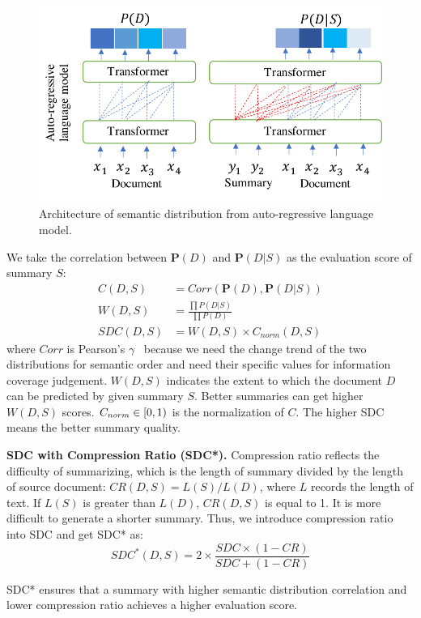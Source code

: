 \begin{figure}[th]
	\centering
	\includegraphics[width=1.0\linewidth]{app.pdf}
	\caption{Architecture of semantic distribution from auto-regressive language model.}
	\label{fig:app}
\end{figure}

We take the correlation between $\mathbf{P}(D)$ and $\mathbf{P}(D|S)$ as the evaluation score of summary $S$:
\begin{align}
	C(D,S)&=Corr(\mathbf{P}(D), \mathbf{P}(D|S)) \\
	W(D,S)&=  \frac{\prod{P(D|S)}}{\prod{P(D)}} \\
	SDC(D,S)&=  W(D,S) \times C_{norm}(D,S)
\end{align}
where $Corr$ is 
Pearson's $\gamma$~\cite{pearson} because we need the change trend of the two distributions for semantic order and need their specific values for information coverage judgement. $W(D,S)$ indicates the extent to which the document $D$ can be predicted by given summary $S$.
Better summaries can get higher $W(D,S)$ scores.
$C_{norm} \in \left[0,1\notag\right)$ is the normalization of $C$.
The higher SDC means the better summary quality.

\textbf{SDC with Compression Ratio (SDC*).}
Compression ratio reflects the difficulty of summarizing,
which is the length of summary divided by the length of source document:
$CR(D, S)=L(S)/L(D)$, where $L$ records the length of text. If $L(S)$ is greater than $L(D)$, $CR(D, S)$ is equal to 1.
It is more difficult to generate a shorter summary.
Thus, we introduce compression ratio into SDC and get SDC* as:
\begin{equation}
	\label{eq:final}
	SDC^*(D, S)=2 \times \frac{SDC\times (1-CR)}{SDC + (1-CR)}
\end{equation}

SDC*  ensures that a summary with higher semantic distribution correlation and lower compression ratio achieves a higher evaluation score.
